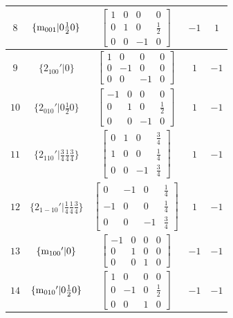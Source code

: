 \documentclass[fleqn,8pt]{jsarticle}
\begin{document}
\begin{longtable}{ccccc}
$ 8 $ & $ \{{\rm m}_{001}|0 \frac{1}{2} 0\} $ & $ \begin{bmatrix} 1 & 0 & 0 & 0 \\ 0 & 1 & 0 & \frac{1}{2} \\ 0 & 0 & -1 & 0 \end{bmatrix} $ & $ -1 $ & $ 1 $ \\ \hline
$ 9 $ & $ \{2{}_{100}{}'|0\} $ & $ \begin{bmatrix} 1 & 0 & 0 & 0 \\ 0 & -1 & 0 & 0 \\ 0 & 0 & -1 & 0 \end{bmatrix} $ & $ 1 $ & $ -1 $ \\ \hline
$ 10 $ & $ \{2{}_{010}{}'|0 \frac{1}{2} 0\} $ & $ \begin{bmatrix} -1 & 0 & 0 & 0 \\ 0 & 1 & 0 & \frac{1}{2} \\ 0 & 0 & -1 & 0 \end{bmatrix} $ & $ 1 $ & $ -1 $ \\ \hline
$ 11 $ & $ \{2{}_{110}{}'|\frac{3}{4} \frac{1}{4} \frac{3}{4}\} $ & $ \begin{bmatrix} 0 & 1 & 0 & \frac{3}{4} \\ 1 & 0 & 0 & \frac{1}{4} \\ 0 & 0 & -1 & \frac{3}{4} \end{bmatrix} $ & $ 1 $ & $ -1 $ \\ \hline
$ 12 $ & $ \{2{}_{1-10}{}'|\frac{1}{4} \frac{1}{4} \frac{3}{4}\} $ & $ \begin{bmatrix} 0 & -1 & 0 & \frac{1}{4} \\ -1 & 0 & 0 & \frac{1}{4} \\ 0 & 0 & -1 & \frac{3}{4} \end{bmatrix} $ & $ 1 $ & $ -1 $ \\ \hline
$ 13 $ & $ \{{\rm m}_{100}{}'|0\} $ & $ \begin{bmatrix} -1 & 0 & 0 & 0 \\ 0 & 1 & 0 & 0 \\ 0 & 0 & 1 & 0 \end{bmatrix} $ & $ -1 $ & $ -1 $ \\ \hline
$ 14 $ & $ \{{\rm m}_{010}{}'|0 \frac{1}{2} 0\} $ & $ \begin{bmatrix} 1 & 0 & 0 & 0 \\ 0 & -1 & 0 & \frac{1}{2} \\ 0 & 0 & 1 & 0 \end{bmatrix} $ & $ -1 $ & $ -1 $ \\ \hline

\end{longtable}
\end{document}
